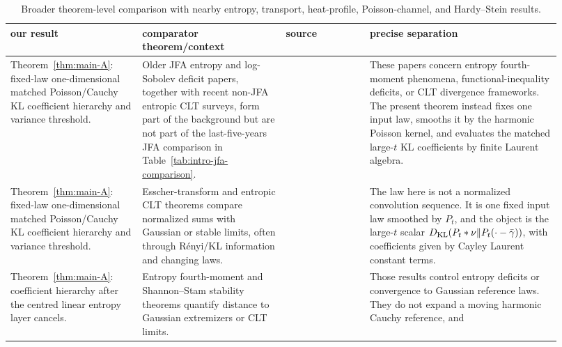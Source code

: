 {\scriptsize
\setlength{\tabcolsep}{3pt}
\renewcommand{\arraystretch}{1.18}
\begin{longtable}{>{\raggedright\arraybackslash}p{0.22\linewidth}|%
>{\raggedright\arraybackslash}p{0.24\linewidth}|%
>{\raggedright\arraybackslash}p{0.14\linewidth}|%
>{\raggedright\arraybackslash}p{0.32\linewidth}}
\caption{Broader theorem-level comparison with nearby entropy, transport,
heat-profile, Poisson-channel, and Hardy--Stein results.}
\label{tab:broader-related-work-comparison}\\
\textbf{our result}
& \textbf{comparator theorem/context}
& \textbf{source}
& \textbf{precise separation}\\
\hline
Theorem~\ref{thm:main-A}: fixed-law one-dimensional matched
Poisson/Cauchy KL coefficient hierarchy and variance threshold.
& Older JFA entropy and log-Sobolev deficit papers, together with recent
non-JFA entropic CLT surveys, form part of the background but are not part of
the last-five-years JFA comparison in Table~\ref{tab:intro-jfa-comparison}.
& \cite{NourdinPeccatiSwan2014EntropyFourthMoment,
BobkovGozlanRobertoSamson2014LogSobolevDeficit,
BobkovGotzeRenyiSurvey2025}
& These papers concern entropy fourth-moment phenomena, functional-inequality
deficits, or CLT divergence frameworks.  The present theorem instead fixes
one input law, smooths it by the harmonic Poisson kernel, and evaluates the
matched large-\(t\) KL coefficients by finite Laurent algebra.\\
\hline
Theorem~\ref{thm:main-A}: fixed-law one-dimensional matched
Poisson/Cauchy KL coefficient hierarchy and variance threshold.
& Esscher-transform and entropic CLT theorems compare normalized sums with
Gaussian or stable limits, often through R{\'e}nyi/KL information and
changing laws.
& \cite{BobkovGotzeEsscher2025}
& The law here is not a normalized convolution sequence.  It is one fixed
input law smoothed by \(P_t\), and the object is the large-\(t\) scalar
\(D_{\rm KL}(P_t*\nu\|P_t(\cdot-\bar\gamma))\), with coefficients given by
Cayley Laurent constant terms.\\
\hline
Theorem~\ref{thm:main-A}: coefficient hierarchy after the centred linear
entropy layer cancels.
& Entropy fourth-moment and Shannon--Stam stability theorems quantify
distance to Gaussian extremizers or CLT limits.
& \cite{NourdinPeccatiSwan2014EntropyFourthMoment,
EldanMikulincer2020ShannonStam,ArtsteinBallBartheNaor2004}
& Those results control entropy deficits or convergence to Gaussian
reference laws.  They do not expand a moving harmonic Cauchy reference, and

\end{longtable}}
